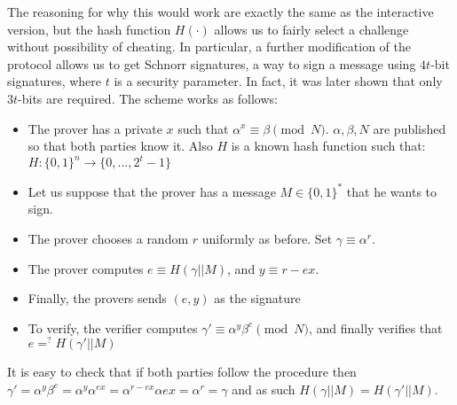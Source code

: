 \documentclass{article}
\begin{document}
The reasoning for why this would work are exactly the same as the interactive version, but the hash function 
$H(\cdot)$ allows us to fairly select a challenge without possibility of cheating. In particular, a further 
modification of the protocol allows us to get Schnorr signatures, a way to sign a message using $4t$-bit signatures,
where $t$ is a security parameter. In fact, it was later shown \cite{nevenHashFunctionRequirements2009} that only $3t$-bits 
are required. The scheme works as follows:
\begin{itemize}
    \item The prover has a private $x$ such that $\alpha^x \equiv \beta \pmod N$. $\alpha, \beta, N$ 
          are published so that both parties know it. Also $H$ is a known hash function such that: $H: \{0, 1\}^n \to \{0, \dots, 2^t - 1\}$
    \item Let us suppose that the prover has a message $M \in \{0, 1 \}^*$ that he wants to sign. 
    \item The prover chooses a random $r$ uniformly as before. Set $\gamma \equiv \alpha^r$.
    \item The prover computes $e \equiv H(\gamma || M)$, and $y \equiv r - ex$.
    \item Finally, the provers sends $(e, y)$ as the signature
    \item To verify, the verifier computes $\gamma' \equiv \alpha^y \beta^e \pmod N$, and finally 
          verifies that $e =^? H(\gamma' || M)$
\end{itemize}

It is easy to check that if both parties follow the procedure then 
$\gamma' = \alpha^y \beta ^e = \alpha^y \alpha^{ex} = \alpha^{r - ex} \alpha{ex} = \alpha^r = \gamma$
and as such $H(\gamma || M) = H(\gamma' || M)$.
\end{document}

